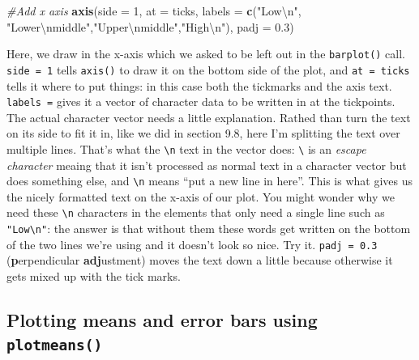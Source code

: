 \documentclass[
]{book}
\newenvironment{Shaded}{\begin{snugshade}}{\end{snugshade}}
\newcommand{\CharTok}[1]{\textcolor[rgb]{0.31,0.60,0.02}{#1}}
\newcommand{\CommentTok}[1]{\textcolor[rgb]{0.56,0.35,0.01}{\textit{#1}}}
\newcommand{\DataTypeTok}[1]{\textcolor[rgb]{0.13,0.29,0.53}{#1}}
\newcommand{\DecValTok}[1]{\textcolor[rgb]{0.00,0.00,0.81}{#1}}
\newcommand{\FloatTok}[1]{\textcolor[rgb]{0.00,0.00,0.81}{#1}}
\newcommand{\KeywordTok}[1]{\textcolor[rgb]{0.13,0.29,0.53}{\textbf{#1}}}
\newcommand{\NormalTok}[1]{#1}
\newcommand{\StringTok}[1]{\textcolor[rgb]{0.31,0.60,0.02}{#1}}
\begin{document}
\begin{Shaded}
\begin{Highlighting}[]
\CommentTok{#Add x axis}
\KeywordTok{axis}\NormalTok{(}\DataTypeTok{side =} \DecValTok{1}\NormalTok{, }
     \DataTypeTok{at =}\NormalTok{ ticks, }
     \DataTypeTok{labels =} \KeywordTok{c}\NormalTok{(}\StringTok{"Low}\CharTok{\textbackslash{}n}\StringTok{"}\NormalTok{, }\StringTok{"Lower}\CharTok{\textbackslash{}n}\StringTok{middle"}\NormalTok{,}\StringTok{"Upper}\CharTok{\textbackslash{}n}\StringTok{middle"}\NormalTok{,}\StringTok{"High}\CharTok{\textbackslash{}n}\StringTok{"}\NormalTok{), }
     \DataTypeTok{padj =} \FloatTok{0.3}\NormalTok{)}
\end{Highlighting}
\end{Shaded}

Here, we draw in the x-axis which we asked to be left out in the \texttt{barplot()} call. \texttt{side\ =\ 1} tells \texttt{axis()} to draw it on the bottom side of the plot, and \texttt{at\ =\ ticks} tells it where to put things: in this case both the tickmarks and the axis text. \texttt{labels\ =} gives it a vector of character data to be written in at the tickpoints. The actual character vector needs a little explanation. Rathed than turn the text on its side to fit it in, like we did in section 9.8, here I'm splitting the text over multiple lines. That's what the \texttt{\textbackslash{}n} text in the vector does: \texttt{\textbackslash{}} is an \emph{escape character} meaing that it isn't processed as normal text in a character vector but does something else, and \texttt{\textbackslash{}n} means ``put a new line in here''. This is what gives us the nicely formatted text on the x-axis of our plot. You might wonder why we need these \texttt{\textbackslash{}n} characters in the elements that only need a single line such as \texttt{"Low\textbackslash{}n"}: the answer is that without them these words get written on the bottom of the two lines we're using and it doesn't look so nice. Try it. \texttt{padj\ =\ 0.3} (\textbf{p}erpendicular \textbf{adj}ustment) moves the text down a little because otherwise it gets mixed up with the tick marks.

\hypertarget{plotting-means-and-error-bars-using-plotmeans}{%
\subsection{\texorpdfstring{Plotting means and error bars using \texttt{plotmeans()}}{Plotting means and error bars using plotmeans()}}\label{plotting-means-and-error-bars-using-plotmeans}}
\end{document}
